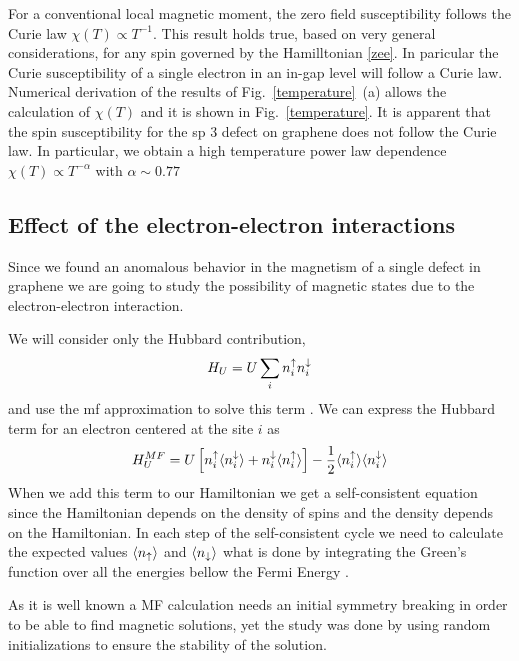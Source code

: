 For a conventional local magnetic moment, the zero field susceptibility follows the Curie law $\chi(T)\propto T^{-1}$. This result holds true, based on very general considerations, for any spin governed by the Hamilltonian \eqref{zee}.
In paricular the Curie susceptibility of a single electron in an in-gap level will follow a Curie law. Numerical derivation of the results of Fig.~\ref{temperature}~(a) allows the calculation of $\chi(T)$ and it is shown in Fig.~\ref{temperature}. It is apparent that the spin susceptibility for the sp 3 defect on graphene does not follow the Curie law. In particular, we obtain a high temperature power law dependence $\chi(T)\propto T^{-\alpha}$ with $\alpha\sim0.77$








\subsection{Effect of the electron-electron interactions}
Since we found an anomalous behavior in the magnetism of a single defect in graphene we are going to study the possibility of magnetic states due to the electron-electron interaction.

We will consider only the Hubbard contribution,
\begin{equation}
  H_{U} = U \sum_{i}n^{\uparrow}_{i}n^{\downarrow}_{i}
\end{equation}
and use the \ac{mf} approximation to solve this term . We can express the Hubbard term for an electron centered at the site $i$ as
\begin{equation}
  H^{MF}_{U} = U\left[n^{\uparrow}_{i}\langle n^{\downarrow}_{i}\rangle +
              n^{\downarrow}_{i}\langle n^{\uparrow}_{i}\rangle\right]-
              \frac{1}{2}\langle n^{\uparrow}_{i}\rangle \langle n^{\downarrow}_{i}\rangle
\end{equation}
When we add this term to our Hamiltonian we get a self-consistent equation since the Hamiltonian depends on the density of spins and the density depends on the Hamiltonian. In each step of the self-consistent cycle we need to calculate the expected values $\langle n_{\uparrow}\rangle$ and $\langle n_{\downarrow}\rangle$ what is done by integrating the Green's function over all the energies bellow the Fermi Energy .

As it is well known a MF calculation needs an initial symmetry breaking in order to be able to find magnetic solutions, yet the study was done by using random initializations to ensure the stability of the solution.

